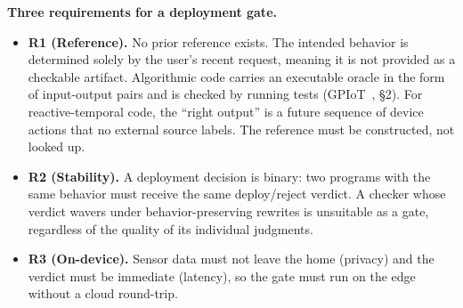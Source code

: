 \documentclass[sigconf,nonacm,anonymous,review]{acmart}
\begin{document}
\textbf{Three requirements for a deployment gate.}
\begin{itemize}
\item \textbf{R1 (Reference).} No prior reference exists. The intended behavior is determined solely by the user’s recent request, meaning it is not provided as a checkable artifact. %
Algorithmic code carries an executable oracle in the form of input-output pairs and is checked by running tests (GPIoT~\cite{gpiot}, \S2). For reactive-temporal code, the ``right output'' is a future sequence of device actions that no external source labels. The reference must be constructed, not looked up.
\item \textbf{R2 (Stability).} A deployment decision is binary: two programs with the same behavior must receive the same deploy/reject verdict. A checker whose verdict wavers under behavior-preserving rewrites is unsuitable as a gate, regardless of the quality of its individual judgments.
\item \textbf{R3 (On-device).} Sensor data must not leave the home (privacy) and the verdict must be immediate (latency), so the gate must run on the edge without a cloud round-trip.
\end{itemize}
\end{document}

